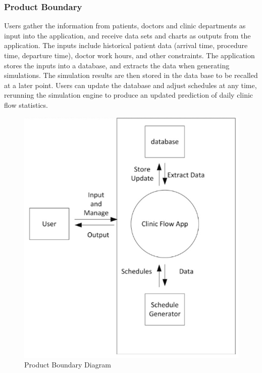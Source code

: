 \documentclass[12pt, titlepage]{article}
\begin{document}
\subsubsection{Product Boundary}
Users gather the information from patients, doctors and clinic departments as input into the application, and receive data sets and charts as outputs from the application. The inputs include historical patient data (arrival time, procedure time, departure time), doctor work hours, and other constraints. The application stores the inputs into a database, and extracts the data when generating simulations. The simulation results are then stored in the data base to be recalled at a later point. Users can update the database and adjust schedules at any time, rerunning the simulation engine to produce an updated prediction of daily clinic flow statistics.

\begin{figure}[H]
  \centering
\includegraphics[scale=0.9]{product_boundary.png}
\caption{Product Boundary Diagram}
\end{figure}
\end{document}
